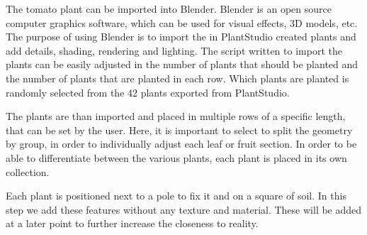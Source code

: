 The tomato plant can be imported into Blender. Blender is an open source computer graphics software, which can be used for visual effects, 3D models, etc. The purpose of using Blender is to import the in PlantStudio created plants and  add details, shading, rendering and lighting. The script written to import the plants can be easily adjusted in the number of plants that should be planted and the number of plants that are planted in each row. Which plants are planted is randomly selected from the 42 plants exported from PlantStudio.

\vspace{5pt}


The plants are than imported and placed in multiple rows of a specific length, that can be set by the user. Here, it is important to select to split the geometry by group, in order to individually adjust each leaf or fruit section. In order to be able to differentiate between the various plants, each plant is placed in its own collection. 

\vspace{5pt}

Each plant is positioned next to a pole to fix it and on a square of soil. In this step we add these features without any texture and material. These will be added at a later point to further increase the closeness to reality. 

\vspace{5pt}

